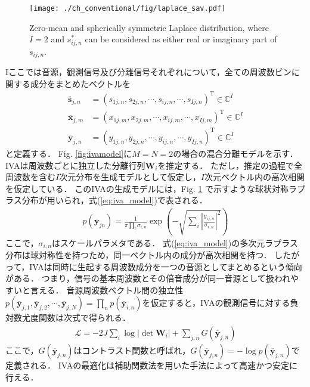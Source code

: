 \begin{figure}[t]
\centering
\texttt{[image: ./ch\_conventional/fig/laplace\_sav.pdf]}
\caption{Zero-mean and spherically symmetric Laplace distribution, where $I=2$ and $s^*_{ij,n}$ can be considered as either real or imaginary part of $s_{ij,n}$.}
\label{fig:laplace}
\end{figure}
Iここでは音源，観測信号及び分離信号それぞれについて，全ての周波数ビンに関する成分をまとめたベクトルを
\begin{align}
    \overline{\bm{s}}_{j,n} &= (s_{1j,n}, s_{2j,n}, \cdots, s_{ij,n}, \cdots, s_{Ij,n} )^{\mathrm{T}} \in \mathbb{C}^{I} \\
    \overline{\bm{x}}_{j,m} &= (x_{1j,m}, x_{2j,m}, \cdots, x_{ij,m}, \cdots, x_{Ij,m} )^{\mathrm{T}} \in \mathbb{C}^{I} \\
    \overline{\bm{y}}_{j,n} &= (y_{1j,n}, y_{2j,n}, \cdots, y_{ij,n}, \cdots, y_{Ij,n} )^{\mathrm{T}} \in \mathbb{C}^{I}
\end{align}
と定義する．
Fig. \ref{fig:ivamodel}に$M=N=2$の場合の混合分離モデルを示す．
IVAは周波数ごとに独立した分離行列$\bm{W}_i$を推定する．
ただし，推定の過程で全周波数を含む$I$次元分布を生成モデルとして仮定し，$I$次元ベクトル内の高次相関を仮定している．
このIVAの生成モデルには，Fig. \ref{fig:laplace} で示すような球状対称ラプラス分布が用いられ，式(\ref{eq:iva_model})で表される．
\begin{align}
  p(\overline{\bm{y}}_{jn}) = \frac{1}{\pi \prod_{i} \sigma_{i,n}} \exp \left(  - \sqrt{ \sum_i \left| \frac{y_{ij,n}}{\sigma_{i,n}} \right|^2}  \right)
\label{eq:iva_model}    
\end{align}
ここで，$\sigma_{i,n}$はスケールパラメタである．
式(\ref{eq:iva_model})の多次元ラプラス分布は球対称性を持つため，同一ベクトル内の成分が高次相関を持つ．
したがって，IVAは同時に生起する周波数成分を一つの音源としてまとめるという傾向がある．
つまり，信号の基本周波数とその倍音成分が同一音源として扱われやすいと言える．
音源周波数ベクトル間の独立性$p(\overline{\bm{y}}_{j,1}, \overline{\bm{y}}_{j,2}, \cdots, \overline{\bm{y}}_{j,N}) = \prod_n p(\overline{\bm{y}}_{i,n})$を仮定すると，IVAの観測信号に対する負対数尤度関数は次式で得られる．
\begin{align}
    \mathcal{L} = -2J \sum_i \log |\det \bm{W}_i| + \sum_{j,n} G(\overline{\bm{y}}_{j,n})
    \label{eq:ivalike}
\end{align}
ここで，$G(\overline{\bm{y}}_{j,n})$はコントラスト関数と呼ばれ，$G(\overline{\bm{y}}_{j,n}) = -\log p(\overline{\bm{y}}_{j,n})$で定義される．
IVAの最適化は補助関数法\cite{auxfunc}を用いた手法によって高速かつ安定に行える\cite{auxIVA, stable_auxIVA}．


